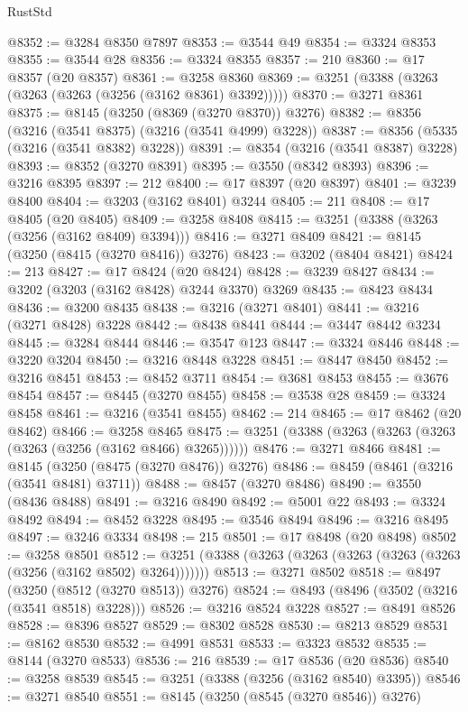 \begin{lexlean}{RustStd}
\begin{coremodule}
@8352 := @3284 @8350 @7897
@8353 := @3544 @49
@8354 := @3324 @8353
@8355 := @3544 @28
@8356 := @3324 @8355
@8357 := 210
@8360 := @17 @8357 (@20 @8357)
@8361 := @3258 @8360
@8369 := @3251 (@3388 (@3263 (@3263 (@3263 (@3256 (@3162 @8361) @3392)))))
@8370 := @3271 @8361
@8375 := @8145 (@3250 (@8369 (@3270 @8370)) @3276)
@8382 := @8356 (@3216 (@3541 @8375) (@3216 (@3541 @4999) @3228))
@8387 := @8356 (@5335 (@3216 (@3541 @8382) @3228))
@8391 := @8354 (@3216 (@3541 @8387) @3228)
@8393 := @8352 (@3270 @8391)
@8395 := @3550 (@8342 @8393)
@8396 := @3216 @8395
@8397 := 212
@8400 := @17 @8397 (@20 @8397)
@8401 := @3239 @8400
@8404 := @3203 (@3162 @8401) @3244
@8405 := 211
@8408 := @17 @8405 (@20 @8405)
@8409 := @3258 @8408
@8415 := @3251 (@3388 (@3263 (@3256 (@3162 @8409) @3394)))
@8416 := @3271 @8409
@8421 := @8145 (@3250 (@8415 (@3270 @8416)) @3276)
@8423 := @3202 (@8404 @8421)
@8424 := 213
@8427 := @17 @8424 (@20 @8424)
@8428 := @3239 @8427
@8434 := @3202 (@3203 (@3162 @8428) @3244 @3370) @3269
@8435 := @8423 @8434
@8436 := @3200 @8435
@8438 := @3216 (@3271 @8401)
@8441 := @3216 (@3271 @8428) @3228
@8442 := @8438 @8441
@8444 := @3447 @8442 @3234
@8445 := @3284 @8444
@8446 := @3547 @123
@8447 := @3324 @8446
@8448 := @3220 @3204
@8450 := @3216 @8448 @3228
@8451 := @8447 @8450
@8452 := @3216 @8451
@8453 := @8452 @3711
@8454 := @3681 @8453
@8455 := @3676 @8454
@8457 := @8445 (@3270 @8455)
@8458 := @3538 @28
@8459 := @3324 @8458
@8461 := @3216 (@3541 @8455)
@8462 := 214
@8465 := @17 @8462 (@20 @8462)
@8466 := @3258 @8465
@8475 := @3251 (@3388 (@3263 (@3263 (@3263 (@3263 (@3256 (@3162 @8466) @3265))))))
@8476 := @3271 @8466
@8481 := @8145 (@3250 (@8475 (@3270 @8476)) @3276)
@8486 := @8459 (@8461 (@3216 (@3541 @8481) @3711))
@8488 := @8457 (@3270 @8486)
@8490 := @3550 (@8436 @8488)
@8491 := @3216 @8490
@8492 := @5001 @22
@8493 := @3324 @8492
@8494 := @8452 @3228
@8495 := @3546 @8494
@8496 := @3216 @8495
@8497 := @3246 @3334
@8498 := 215
@8501 := @17 @8498 (@20 @8498)
@8502 := @3258 @8501
@8512 := @3251 (@3388 (@3263 (@3263 (@3263 (@3263 (@3263 (@3256 (@3162 @8502) @3264)))))))
@8513 := @3271 @8502
@8518 := @8497 (@3250 (@8512 (@3270 @8513)) @3276)
@8524 := @8493 (@8496 (@3502 (@3216 (@3541 @8518) @3228)))
@8526 := @3216 @8524 @3228
@8527 := @8491 @8526
@8528 := @8396 @8527
@8529 := @8302 @8528
@8530 := @8213 @8529
@8531 := @8162 @8530
@8532 := @4991 @8531
@8533 := @3323 @8532
@8535 := @8144 (@3270 @8533)
@8536 := 216
@8539 := @17 @8536 (@20 @8536)
@8540 := @3258 @8539
@8545 := @3251 (@3388 (@3256 (@3162 @8540) @3395))
@8546 := @3271 @8540
@8551 := @8145 (@3250 (@8545 (@3270 @8546)) @3276)

\end{coremodule}
\end{lexlean}
